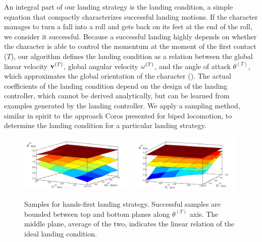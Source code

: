 An integral part of our landing strategy is the landing condition, a
simple equation that compactly characterizes successful landing
motions.
 If the character manages to turn a fall
into a roll and gets back on its feet at the end of the roll, we
consider it successful.  Because a successful landing highly depends
on whether the character is able to control the momentum
at the moment of the first contact ($T$),
our algorithm defines the landing condition as a relation between the
global linear velocity $\mathbf{v}^{(T)}$, global angular velocity
$\mathbf{\omega}^{(T)}$, and the angle of attack $\theta^{(T)}$, which
approximates the global orientation of the character
().
The actual
coefficients of the landing condition depend on the design of the
landing controller, which cannot be derived analytically, but can be
learned from examples generated by the landing controller. We apply a
sampling method, similar in spirit to the approach Coros \etal
\cite{Coros:2009:RTC} presented for biped locomotion, to determine the
landing condition for a particular landing strategy.  

\begin{figure}[ht]
\center
  \includegraphics[width=0.49\textwidth]{images/sampleVZWX}
  \includegraphics[width=0.49\textwidth]{images/sampleVYVZ}
  \caption{
    Samples for hands-first landing strategy. Successful samples are
    bounded between top and bottom planes along $\theta^{(T)}$
    axis. The middle plane, average of the two, indicates the linear
    relation of the ideal landing condition. 
  }
 \label{fig:landing_samplesPlanar}
\end{figure}
 
